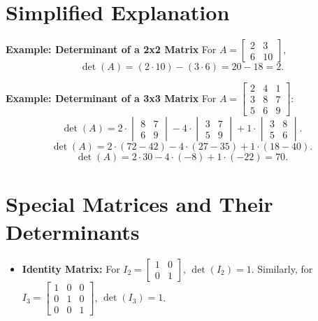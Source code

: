 \documentclass{article}
\begin{document}
\section*{Simplified Explanation}

\textbf{Example: Determinant of a 2x2 Matrix}
For $A =
\begin{bmatrix}
  2 & 3 \\
  6 & 10
\end{bmatrix}$,
\[
  \det(A) = (2 \cdot 10) - (3 \cdot 6) = 20 - 18 = 2.
\]

\textbf{Example: Determinant of a 3x3 Matrix}
For $A =
\begin{bmatrix}
  2 & 4 & 1 \\
  3 & 8 & 7 \\
  5 & 6 & 9
\end{bmatrix}$:
\[
  \det(A) = 2 \cdot
  \begin{vmatrix}
    8 & 7 \\
    6 & 9
  \end{vmatrix}
  - 4 \cdot
  \begin{vmatrix}
    3 & 7 \\
    5 & 9
  \end{vmatrix}
  + 1 \cdot
  \begin{vmatrix}
    3 & 8 \\
    5 & 6
  \end{vmatrix}.
\]
\[
  \det(A) = 2 \cdot (72 - 42) - 4 \cdot (27 - 35) + 1 \cdot (18 - 40).
\]
\[
  \det(A) = 2 \cdot 30 - 4 \cdot (-8) + 1 \cdot (-22) = 70.
\]

\section*{Special Matrices and Their Determinants}

\begin{itemize}
  \item \textbf{Identity Matrix:}
    For $I_2 =
    \begin{bmatrix}
      1 & 0 \\
      0 & 1
    \end{bmatrix}$, $\det(I_2) = 1$.
    Similarly, for $I_3 =
    \begin{bmatrix}
      1 & 0 & 0 \\
      0 & 1 & 0 \\
      0 & 0 & 1
    \end{bmatrix}$, $\det(I_3) = 1$.
\end{itemize}
\end{document}
